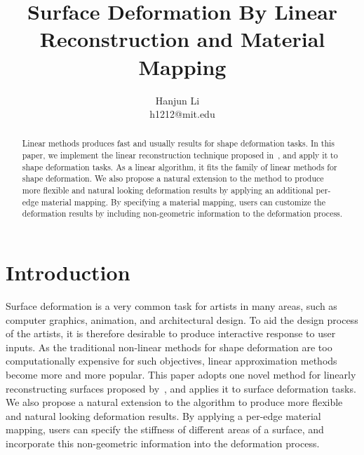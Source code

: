 \documentclass{6838publ}
\title[Linear Reconstruction and Material Mapping]{Surface Deformation
  By Linear Reconstruction and Material Mapping}
\author{Hanjun Li\ \ \\
  h1212@mit.edu
}
\begin{document}

\maketitle

\begin{abstract} Linear methods produces fast and usually results for
shape deformation tasks. In this paper, we implement the linear
reconstruction technique proposed in~\cite{wang2012linear}, and apply
it to shape deformation tasks. As a linear algorithm, it fits the
family of linear methods for shape deformation. We also propose a
natural extension to the method to produce more flexible and natural
looking deformation results by applying an additional per-edge material
mapping. By specifying a material mapping, users can customize the
deformation results by including non-geometric information to the
deformation process.
\end{abstract}

\section{Introduction} \label{sec:intro} Surface deformation is a very
common task for artists in many areas, such as computer graphics,
animation, and architectural design. To aid the design process of the
artists, it is therefore desirable to produce interactive response to
user inputs. As the traditional non-linear methods for shape
deformation are too computationally expensive for such objectives,
linear approximation methods become more and more popular. This paper
adopts one novel method for linearly reconstructing surfaces proposed
by~\cite{wang2012linear}, and applies it to surface deformation
tasks. We also propose a natural extension to the algorithm to produce
more flexible and natural looking deformation results. By applying a
per-edge material mapping, users can specify the stiffness of
different areas of a surface, and incorporate this non-geometric
information into the deformation process.
\end{document}
